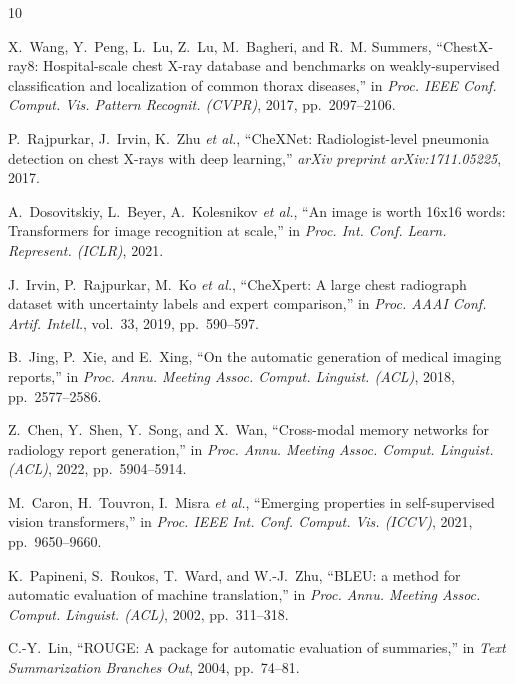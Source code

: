 \documentclass[conference]{IEEEtran}
\begin{document}
\balance
\begin{thebibliography}{10}

X.~Wang, Y.~Peng, L.~Lu, Z.~Lu, M.~Bagheri, and R.~M. Summers, ``ChestX-ray8: Hospital-scale chest X-ray database and benchmarks on weakly-supervised classification and localization of common thorax diseases,'' in \textit{Proc. IEEE Conf. Comput. Vis. Pattern Recognit. (CVPR)}, 2017, pp.~2097--2106.

P.~Rajpurkar, J.~Irvin, K.~Zhu \textit{et al.}, ``CheXNet: Radiologist-level pneumonia detection on chest X-rays with deep learning,'' \textit{arXiv preprint arXiv:1711.05225}, 2017.

A.~Dosovitskiy, L.~Beyer, A.~Kolesnikov \textit{et al.}, ``An image is worth 16x16 words: Transformers for image recognition at scale,'' in \textit{Proc. Int. Conf. Learn. Represent. (ICLR)}, 2021.

J.~Irvin, P.~Rajpurkar, M.~Ko \textit{et al.}, ``CheXpert: A large chest radiograph dataset with uncertainty labels and expert comparison,'' in \textit{Proc. AAAI Conf. Artif. Intell.}, vol.~33, 2019, pp.~590--597.

B.~Jing, P.~Xie, and E.~Xing, ``On the automatic generation of medical imaging reports,'' in \textit{Proc. Annu. Meeting Assoc. Comput. Linguist. (ACL)}, 2018, pp.~2577--2586.

Z.~Chen, Y.~Shen, Y.~Song, and X.~Wan, ``Cross-modal memory networks for radiology report generation,'' in \textit{Proc. Annu. Meeting Assoc. Comput. Linguist. (ACL)}, 2022, pp.~5904--5914.

M.~Caron, H.~Touvron, I.~Misra \textit{et al.}, ``Emerging properties in self-supervised vision transformers,'' in \textit{Proc. IEEE Int. Conf. Comput. Vis. (ICCV)}, 2021, pp.~9650--9660.

K.~Papineni, S.~Roukos, T.~Ward, and W.-J.~Zhu, ``BLEU: a method for automatic evaluation of machine translation,'' in \textit{Proc. Annu. Meeting Assoc. Comput. Linguist. (ACL)}, 2002, pp.~311--318.

C.-Y.~Lin, ``ROUGE: A package for automatic evaluation of summaries,'' in \textit{Text Summarization Branches Out}, 2004, pp.~74--81.


\end{thebibliography}
\end{document}
